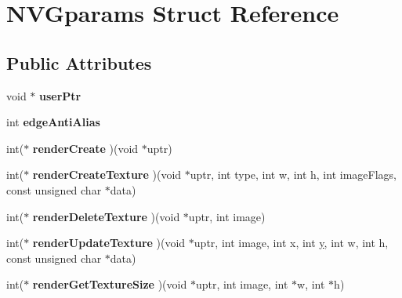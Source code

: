 \hypertarget{struct_n_v_gparams}{\section{N\+V\+Gparams Struct Reference}
\label{struct_n_v_gparams}
}
\subsection*{Public Attributes}
\begin{DoxyCompactItemize}
\item 
\hypertarget{struct_n_v_gparams_a6976a0363fdbfa0ef1e756556ef05f97}{void $\ast$ {\bfseries user\+Ptr}}\label{struct_n_v_gparams_a6976a0363fdbfa0ef1e756556ef05f97}

\item 
\hypertarget{struct_n_v_gparams_a273c8d7199cc5dc4f1a69e12f0b90229}{int {\bfseries edge\+Anti\+Alias}}\label{struct_n_v_gparams_a273c8d7199cc5dc4f1a69e12f0b90229}

\item 
\hypertarget{struct_n_v_gparams_ae62f4124bb147d342edfcbc8c233c782}{int($\ast$ {\bfseries render\+Create} )(void $\ast$uptr)}\label{struct_n_v_gparams_ae62f4124bb147d342edfcbc8c233c782}

\item 
\hypertarget{struct_n_v_gparams_ae801ecf9e3f412eda60524ef6ff8ce26}{int($\ast$ {\bfseries render\+Create\+Texture} )(void $\ast$uptr, int type, int w, int h, int image\+Flags, const unsigned char $\ast$data)}\label{struct_n_v_gparams_ae801ecf9e3f412eda60524ef6ff8ce26}

\item 
\hypertarget{struct_n_v_gparams_a165c064c1c1a454a45e2848feedd5fdd}{int($\ast$ {\bfseries render\+Delete\+Texture} )(void $\ast$uptr, int image)}\label{struct_n_v_gparams_a165c064c1c1a454a45e2848feedd5fdd}

\item 
\hypertarget{struct_n_v_gparams_ab9ece91b2fa9528d2fde0a134086f3a5}{int($\ast$ {\bfseries render\+Update\+Texture} )(void $\ast$uptr, int image, int x, int \hyperlink{_ice_utils_8h_aa7ffaed69623192258fb8679569ff9ba}{y}, int w, int h, const unsigned char $\ast$data)}\label{struct_n_v_gparams_ab9ece91b2fa9528d2fde0a134086f3a5}

\item 
\hypertarget{struct_n_v_gparams_a2ecbd50cea119eb702cfbab7538596b8}{int($\ast$ {\bfseries render\+Get\+Texture\+Size} )(void $\ast$uptr, int image, int $\ast$w, int $\ast$h)}\label{struct_n_v_gparams_a2ecbd50cea119eb702cfbab7538596b8}


\end{DoxyCompactItemize}
